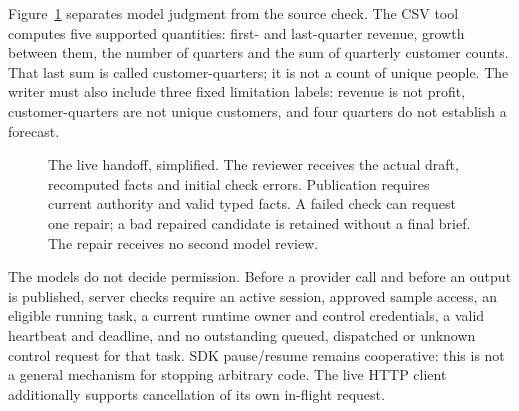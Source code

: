 \documentclass[11pt,letterpaper]{article}
\begin{document}
Figure~\ref{fig:handoff} separates model judgment from the source check. The CSV tool computes five supported quantities: first- and last-quarter revenue, growth between them, the number of quarters and the sum of quarterly customer counts. That last sum is called customer-quarters; it is not a count of unique people. The writer must also include three fixed limitation labels: revenue is not profit, customer-quarters are not unique customers, and four quarters do not establish a forecast.

\begin{figure}[htbp]
\centering
{}
\caption{The live handoff, simplified. The reviewer receives the actual draft, recomputed facts and initial check errors. Publication requires current authority and valid typed facts. A failed check can request one repair; a bad repaired candidate is retained without a final brief. The repair receives no second model review.}
\label{fig:handoff}
\end{figure}

The models do not decide permission. Before a provider call and before an output is published, server checks require an active session, approved sample access, an eligible running task, a current runtime owner and control credentials, a valid heartbeat and deadline, and no outstanding queued, dispatched or unknown control request for that task. SDK pause/resume remains cooperative: this is not a general mechanism for stopping arbitrary code. The live HTTP client additionally supports cancellation of its own in-flight request.
\end{document}
